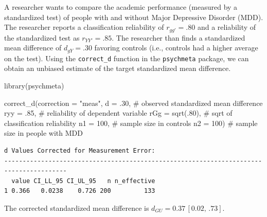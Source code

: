 \documentclass[
  letterpaper,
  DIV=11,
  numbers=noendperiod]{scrreprt}
\newenvironment{Shaded}{}{}
\newcommand{\AttributeTok}[1]{\textcolor[rgb]{0.00,0.34,0.68}{#1}}
\newcommand{\CommentTok}[1]{\textcolor[rgb]{0.54,0.53,0.53}{#1}}
\newcommand{\DecValTok}[1]{\textcolor[rgb]{0.69,0.50,0.00}{#1}}
\newcommand{\FunctionTok}[1]{\textcolor[rgb]{0.39,0.29,0.61}{#1}}
\newcommand{\NormalTok}[1]{\textcolor[rgb]{0.12,0.11,0.11}{#1}}
\newcommand{\StringTok}[1]{\textcolor[rgb]{0.75,0.01,0.01}{#1}}
\begin{document}
\begin{tcolorbox}[enhanced jigsaw, opacityback=0, coltitle=black, toprule=.15mm, colframe=quarto-callout-note-color-frame, bottomtitle=1mm, rightrule=.15mm, colbacktitle=quarto-callout-note-color!10!white, left=2mm, bottomrule=.15mm, breakable, title={Applied Example in R}, colback=white, opacitybacktitle=0.6, titlerule=0mm, arc=.35mm, leftrule=.75mm, toptitle=1mm]

A researcher wants to compare the academic performance (measured by a
standardized test) of people with and without Major Depressive Disorder
(MDD). The researcher reports a classification reliability of
\(r_{gg'}=.80\) and a reliability of the standardized test as
\(r_{YY'}=.85\). The researcher than finds a standardized mean
difference of \(d_{gY}=.30\) favoring controls (i.e., controls had a
higher average on the test). Using the \texttt{correct\_d} function in
the \texttt{psychmeta} package, we can obtain an unbiased estimate of
the target standardized mean difference.

\begin{Shaded}
\begin{Highlighting}[]
\FunctionTok{library}\NormalTok{(psychmeta)}

\FunctionTok{correct\_d}\NormalTok{(}\AttributeTok{correction =} \StringTok{"meas"}\NormalTok{,}
          \AttributeTok{d =}\NormalTok{ .}\DecValTok{30}\NormalTok{,   }\CommentTok{\# observed standardized mean difference}
          \AttributeTok{ryy =}\NormalTok{ .}\DecValTok{85}\NormalTok{, }\CommentTok{\# reliability of dependent variable}
          \AttributeTok{rGg =} \FunctionTok{sqrt}\NormalTok{(.}\DecValTok{80}\NormalTok{), }\CommentTok{\# sqrt of classification reliability}
          \AttributeTok{n1 =} \DecValTok{100}\NormalTok{, }\CommentTok{\# sample size in controls}
          \AttributeTok{n2 =} \DecValTok{100}\NormalTok{) }\CommentTok{\# sample size in people with MDD}
\end{Highlighting}
\end{Shaded}

\begin{verbatim}
d Values Corrected for Measurement Error:
---------------------------------------------------------------------------------------
  value CI_LL_95 CI_UL_95   n n_effective
1 0.366   0.0238    0.726 200         133
\end{verbatim}

The corrected standardized mean difference is
\(d_{GU}=0.37\, [0.02,\, .73]\).

\end{tcolorbox}
\end{document}

